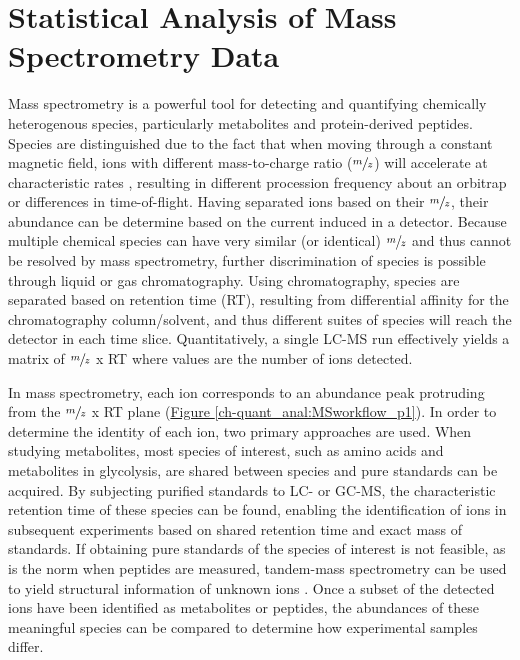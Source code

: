 
\chapter{Statistical Analysis of Mass Spectrometry Data\label{ch:quant_anal}}

Mass spectrometry is a powerful tool for detecting and quantifying chemically heterogenous species, particularly metabolites and protein-derived peptides. Species are distinguished due to the fact that when moving through a constant magnetic field, ions with different mass-to-charge ratio ($\sfrac{m}{z}$) will accelerate at characteristic rates \cite{Boyd:2011vt}, resulting in different procession frequency about an orbitrap or differences in time-of-flight. Having separated ions based on their $\sfrac{m}{z}$, their abundance can be determine based on the current induced in a detector.  Because multiple chemical species can have very similar (or identical) $\sfrac{m}{z}$ and thus cannot be resolved by mass spectrometry, further discrimination of species is possible through liquid or gas chromatography.  Using chromatography, species are separated based on retention time (RT), resulting from differential affinity for the chromatography column/solvent, and thus different suites of species will reach the detector in each time slice.  Quantitatively, a single LC-MS run effectively yields a matrix of $\sfrac{m}{z}$ x RT where values are the number of ions detected.  

In mass spectrometry, each ion corresponds to an abundance peak protruding from the $\sfrac{m}{z}$ x RT plane (\hyperref[ch-quant_anal:MSworkflow_p1]{Figure \ref{ch-quant_anal:MSworkflow_p1}}). In order to determine the identity of each ion, two primary approaches are used.  When studying metabolites, most species of interest, such as amino acids and metabolites in glycolysis, are shared between species and pure standards can be acquired.  By subjecting purified standards to LC- or GC-MS, the characteristic retention time of these species can be found, enabling the identification of ions in subsequent experiments based on shared retention time and exact mass of standards.  If obtaining pure standards of the species of interest is not feasible, as is the norm when peptides are measured, tandem-mass spectrometry can be used to yield structural information of unknown ions \cite{Nesvizhskii:2005jp, Huang:2012tl}.  Once a subset of the detected ions have been identified as metabolites or peptides, the abundances of these meaningful species can be compared to determine how experimental samples differ.

